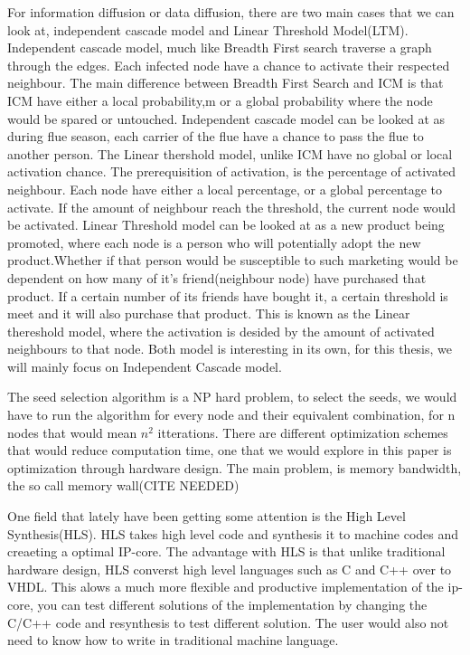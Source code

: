 For information diffusion or data diffusion, there are two main cases that we can look at, independent cascade model and Linear Threshold Model(LTM). Independent cascade model, much like Breadth First search traverse a graph through the edges. Each infected node have a chance to activate their respected neighbour. The main difference between Breadth First Search and ICM is that ICM have either a local probability,m or a global probability where the node would be spared or untouched. Independent cascade model can be looked at as during flue season, each carrier of the flue have a chance to pass the flue to another person. The Linear thershold model, unlike ICM have no global or local activation chance. The prerequisition of activation, is the percentage of activated neighbour. Each node have either a local percentage, or a global percentage to activate. If the amount of neighbour reach the threshold, the current node would be activated. Linear Threshold model can be looked at as a new product being promoted, where each node is a person who will  potentially adopt the new product.Whether if that person would be susceptible to such marketing would be dependent on how many of it's friend(neighbour node) have purchased that product. If a certain number of its friends have bought it, a certain threshold is meet and it will also purchase that product. This is known as the Linear thereshold model, where the activation is desided by the amount of activated neighbours to that node. Both model is interesting in its own, for this thesis, we will mainly focus on Independent Cascade model.  



The seed selection algorithm is a NP hard problem, to select the seeds, we would have to run the algorithm for every node and their equivalent combination, for n nodes that would mean $n^2$ itterations. There are different optimization schemes that would reduce computation time, one that we would explore in this paper is optimization through hardware design. The main problem, is memory bandwidth, the so call memory wall(CITE NEEDED)

One field that lately have been getting some attention is the High Level Synthesis(HLS).  HLS takes high level code and synthesis it to machine codes and creaeting a optimal IP-core. The advantage with HLS is that unlike traditional hardware design, HLS converst high level languages such as C and C++ over to VHDL. This alows a much more flexible and productive implementation of the ip-core, you can test different solutions of the implementation by changing the C/C++ code and resynthesis to test different solution. The user would also not need to know how to write in traditional machine language. 

